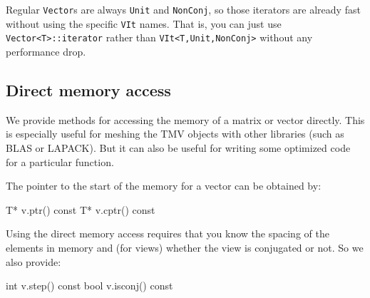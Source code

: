 \documentclass[twoside,letterpaper,11pt]{article}
\renewcommand{\tt}[1]{{\lstinline {#1}}}
\begin{document}
Regular \tt{Vector}s are always \tt{Unit} and \tt{NonConj}, so those iterators
are already fast without using the specific \tt{VIt} names. 
That is, you can just use \tt{Vector<T>::iterator} rather than \tt{VIt<T,Unit,NonConj>}
without any performance drop.

\subsection{Direct memory access}

We provide methods for accessing the memory of a matrix or vector directly.
This is especially useful for meshing the TMV objects with other libraries
(such as BLAS or LAPACK).  But it can also be useful for writing some
optimized code for a particular function.  

The pointer to the start of the memory for a vector can be obtained by:
\begin{tmvcode}
T* v.ptr()
const T* v.cptr() const
\end{tmvcode}

Using the direct memory access
requires that you know the spacing of the elements in memory and
(for views) whether the view is conjugated or not.  So we also provide:
\begin{tmvcode}
int v.step() const
bool v.isconj() const
\end{tmvcode}
\end{document}
